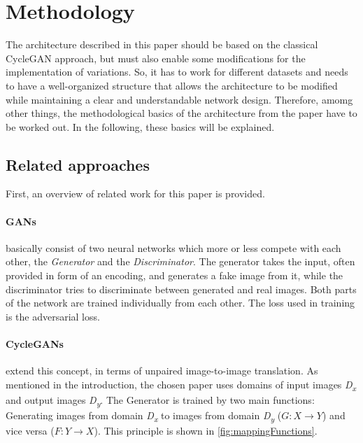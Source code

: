 \documentclass[fleqn,10pt]{SelfArx} %
\begin{document}

\section{Methodology}

The architecture described in this paper should be based on the classical Cycle\ac{GAN} approach, but must also enable some modifications for the implementation of variations. So, it has to work for different datasets and needs to have a well-organized structure that allows the architecture to be modified while maintaining a clear and understandable network design. Therefore, amomg other things, the methodological basics of the architecture from the paper have to be worked out. In the following, these basics will be explained.

\subsection{Related approaches}
First, an overview of related work for this paper is provided.

\paragraph{\acl{GAN}s} basically consist of two neural networks which more or less compete with each other, the \textit{Generator} and the \textit{Discriminator}. The generator takes the input, often provided in form of an encoding, and generates a fake image from it, while the discriminator tries to discriminate between generated and real images. Both parts of the network are trained individually from each other. The loss used in training is the adversarial loss.~\cite{Introduction-to-Cycle-GANs, GAN-Courseware}

\paragraph{Cycle\ac{GAN}s} extend this concept, in terms of unpaired image-to-image translation. As mentioned in the introduction, the chosen paper uses domains of input images \textit{D\textsubscript{x}} and output images \textit{D\textsubscript{y}}. The Generator is trained by two main functions: Generating images from domain \textit{D\textsubscript{x}} to images from domain \textit{D\textsubscript{y}} ($G: X \rightarrow Y$) and vice versa ($F: Y \rightarrow X$). This principle is shown in \autoref{fig:mappingFunctions}.~\cite{image-to-image-ccan}
\end{document}
